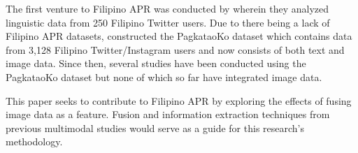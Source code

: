 The first venture to Filipino APR was conducted by \citet{tighe_modeling_2018} wherein they analyzed linguistic data from 250 Filipino Twitter users. Due to there being a lack of Filipino APR datasets, \citet{tighe_acorda_2022} constructed the PagkataoKo dataset which contains data from 3,128 Filipino Twitter/Instagram users and now consists of both text and image data. Since then, several studies have been conducted using the PagkataoKo dataset but none of which so far have integrated image data.

This paper seeks to contribute to Filipino APR by exploring the effects of fusing image data as a feature. Fusion and information extraction techniques from previous multimodal studies would serve as a guide for this research’s methodology.







